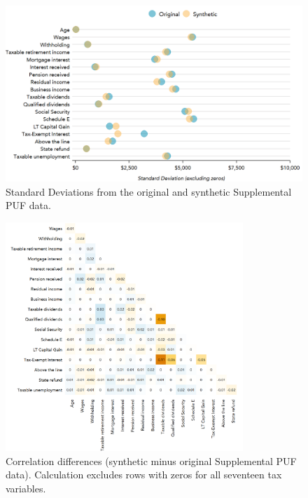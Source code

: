 \documentclass[11pt,runningheads,oribibl]{llncs}
\begin{document}
\begin{figure}
    \includegraphics[width=\textwidth]{figures/standard-deviation-1.png}
    \caption{Standard Deviations from the original and synthetic Supplemental PUF data.} \label{fig:sd}
\end{figure}



\begin{figure}
    \begin{center}
        \includegraphics[width=0.8\textwidth]{figures/correlation-fit-1.png}
        \caption{Correlation differences (synthetic minus original Supplemental PUF data). Calculation excludes rows with zeros for all seventeen tax variables.} \label{fig:corr}
    \end{center}
\end{figure}
\end{document}
